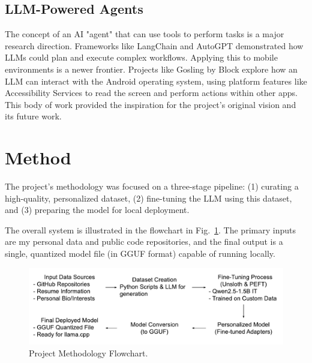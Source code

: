 \documentclass[conference]{IEEEtran}
\begin{document}
\subsection{LLM-Powered Agents}
The concept of an AI "agent" that can use tools to perform tasks is a major research direction. Frameworks like LangChain and AutoGPT demonstrated how LLMs could plan and execute complex workflows. Applying this to mobile environments is a newer frontier. Projects like Gosling by Block \cite{block2024gosling} explore how an LLM can interact with the Android operating system, using platform features like Accessibility Services to read the screen and perform actions within other apps. This body of work provided the inspiration for the project's original vision and its future work.

\section{Method}

The project's methodology was focused on a three-stage pipeline: (1) curating a high-quality, personalized dataset, (2) fine-tuning the LLM using this dataset, and (3) preparing the model for local deployment.

The overall system is illustrated in the flowchart in Fig.~\ref{fig:flowchart}. The primary inputs are my personal data and public code repositories, and the final output is a single, quantized model file (in GGUF format) capable of running locally.

\begin{figure}[H]
    \centering
    \includegraphics[width=0.9\linewidth]{images/flowchart.pdf}
    \caption{Project Methodology Flowchart.}
    \label{fig:flowchart}
\end{figure}
\end{document}

